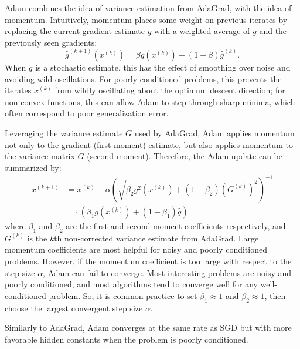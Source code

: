 \documentclass[letterpaper, 10 pt, conference]{IEEEtran}  %
\begin{document}
Adam \cite{kingma2014adam} combines the idea of variance estimation
from AdaGrad, with the idea of momentum.  Intuitively, momentum places
some weight on previous iterates by replacing the current gradient
estimate $g$ with a weighted average of $g$ and the previously seen
gradients:
$$ \hat{g}^{(k+1)}(x^{(k)}) = \beta g(x^{(k)}) + (1-\beta)\hat{g}^{(k)}. $$
When $g$ is a stochastic estimate, this has the effect of smoothing
over noise and avoiding wild oscillations. For poorly conditioned
problems, this prevents the iterates $x^{(k)}$ from wildly oscillating
about the optimum descent direction; for non-convex functions, this
can allow Adam to step through sharp minima, which often correspond to
poor generalization error.

Leveraging the variance estimate $G$ used by AdaGrad, Adam applies
momentum not only to the gradient (first moment) estimate, but also
applies momentum to the variance matrix $G$ (second moment).
Therefore, the Adam update can be summarized by:
\begin{align*}
  x^{(k+1)} &= x^{(k)} - \alpha \left(\sqrt{\beta_2 g^2(x^{(k)}) + (1-\beta_2)(G^{(k)})^2}\right)^{-1}\\
  &\quad\cdot\left(\beta_1 g(x^{(k)}) + (1-\beta_1)\hat{g}\right)
\end{align*}
where $\beta_1$ and $\beta_2$ are the first and second moment
coefficients respectively, and $G^{(k)}$ is the $k$th non-corrected
variance estimate from AdaGrad.  Large momentum coefficients are most
helpful for noisy and poorly conditioned problems.  However, if the
momentum coefficient is too large with respect to the step size
$\alpha$, Adam can fail to converge.  Most interesting problems are
noisy and poorly conditioned, and most algorithms tend to converge
well for any well-conditioned problem.  So, it is common practice to
set $\beta_1 \approx 1$ and $\beta_2 \approx 1$, then choose the
largest convergent step size $\alpha$.

Similarly to AdaGrad, Adam converges at the same rate as SGD but with
more favorable hidden constants when the problem is poorly
conditioned.
\end{document}

